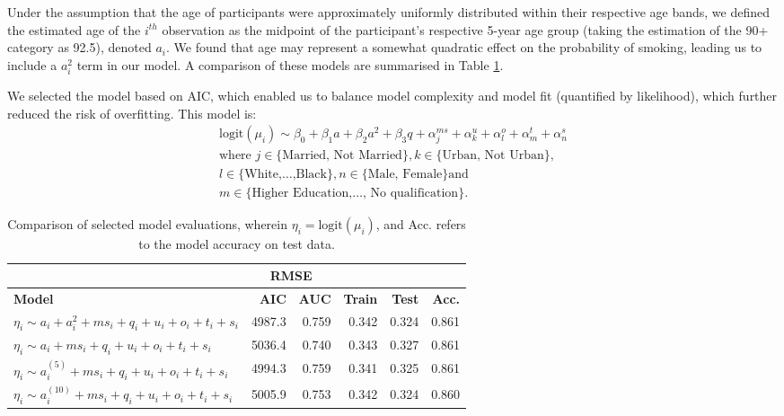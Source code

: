 \documentclass[
  11pt,
  twocolumn]{article}
\begin{document}
Under the assumption that the age of participants were approximately
uniformly distributed within their respective age bands, we defined the
estimated age of the \(i^{th}\) observation as the midpoint of the
participant's respective 5-year age group (taking the estimation of the
90+ category as 92.5), denoted \(a_i\). We found that age may represent
a somewhat quadratic effect on the probability of smoking, leading us to
include a \(a_i^2\) term in our model. A comparison of these models are
summarised in Table \ref{tab:output-model-selection-table}.

We selected the model based on AIC, which enabled us to balance model
complexity and model fit (quantified by likelihood), which further
reduced the risk of overfitting. This model is: \begin{align*}
\text{logit}(\mu_i) \sim \beta_0 + \beta_1a + \beta_2a^2 + \beta_3q + \alpha^{ms}_j + \alpha^{u}_k + \alpha^{o}_l + \alpha^{t}_m + \alpha^{s}_n \\\text{where } j \in \{\text{Married, Not Married}\}, k \in \{\text{Urban, Not Urban}\},\\ l \in \{\text{White,}\ldots\text{,Black}\}, n \in \{\text{Male, Female\} and}\ \\ m \in \{\text{Higher Education,}\ldots\text{, No qualification}\}.
\end{align*}

\begin{table}

\caption{\label{tab:outputmodelselectiontable}Comparison of selected model evaluations, wherein $\eta_i = \text{logit}(\mu_i)$, and Acc. refers to the model accuracy on test data.\label{tab:output-model-selection-table}}
\centering
\fontsize{8}{10}\selectfont
\begin{tabular}[t]{>{\raggedright\arraybackslash}p{9em}|r|r|r|r|r}
\hline
\multicolumn{3}{c|}{ } & \multicolumn{2}{c|}{RMSE} & \multicolumn{1}{c}{ } \\
\cline{4-5}
\textbf{Model} & \textbf{AIC} & \textbf{AUC} & \textbf{Train} & \textbf{Test} & \textbf{Acc.}\\
\hline
$\eta_i \sim a_i + a_i^2 + ms_i + q_i + u_i + o_i + t_i + s_i$ & 4987.3 & 0.759 & 0.342 & 0.324 & 0.861\\
\hline
$\eta_i \sim a_i + ms_i + q_i + u_i + o_i + t_i + s_i$ & 5036.4 & 0.740 & 0.343 & 0.327 & 0.861\\
\hline
$\eta_i \sim a_i^{(5)} + ms_i + q_i + u_i + o_i + t_i + s_i$ & 4994.3 & 0.759 & 0.341 & 0.325 & 0.861\\
\hline
$\eta_i \sim a_i^{(10)} + ms_i + q_i + u_i + o_i + t_i + s_i$ & 5005.9 & 0.753 & 0.342 & 0.324 & 0.860\\
\hline
\end{tabular}
\end{table}
\end{document}
